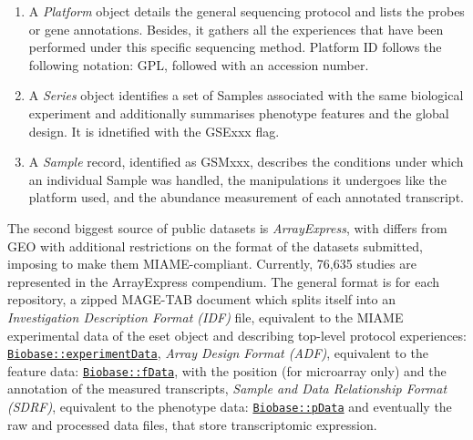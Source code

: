 \begin{enumerate}
\item
  A \emph{Platform} object details the general sequencing protocol and lists the probes or gene annotations. Besides, it gathers all the experiences that have been performed under this specific sequencing method. Platform ID follows the following notation: GPL, followed with an accession number.
\item
  A \emph{Series} object identifies a set of Samples associated with the same biological experiment and additionally summarises phenotype features and the global design. It is idnetified with the GSExxx flag.
\item
  A \emph{Sample} record, identified as GSMxxx, describes the conditions under which an individual Sample was handled, the manipulations it undergoes like the platform used, and the abundance measurement of each annotated transcript.
\end{enumerate}

The second biggest source of public datasets is \emph{ArrayExpress}, with differs from GEO with additional restrictions on the format of the datasets submitted, imposing to make them MIAME-compliant. Currently, 76,635 studies are represented in the ArrayExpress compendium. The general format is for each repository, a zipped MAGE-TAB document which splits itself into an \emph{Investigation Description Format (IDF)} file, equivalent to the MIAME experimental data of the eset object and describing top-level protocol experiences: \href{https://rdrr.io/pkg/Biobase/man/abstract.html}{\texttt{Biobase::experimentData}}, \emph{Array Design Format (ADF)}, equivalent to the feature data: \href{https://rdrr.io/pkg/Biobase/man/featureData.html}{\texttt{Biobase::fData}}, with the position (for microarray only) and the annotation of the measured transcripts, \emph{Sample and Data Relationship Format (SDRF)}, equivalent to the phenotype data: \href{https://rdrr.io/pkg/Biobase/man/phenoData.html}{\texttt{Biobase::pData}} and eventually the raw and processed data files, that store transcriptomic expression.

